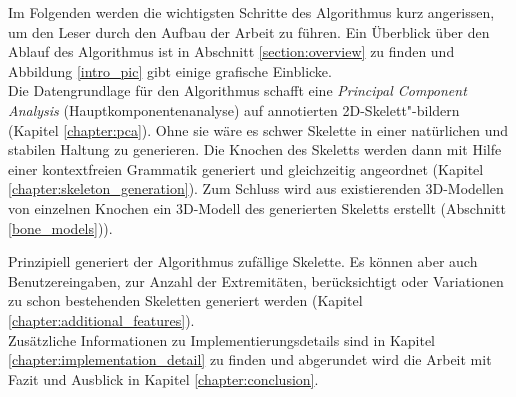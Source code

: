 Im Folgenden werden die wichtigsten Schritte des Algorithmus kurz angerissen, um den Leser durch den Aufbau der Arbeit zu führen. Ein Überblick über den Ablauf des Algorithmus ist in Abschnitt \ref{section:overview} zu finden und Abbildung \ref{intro_pic} gibt einige grafische Einblicke.\\
Die Datengrundlage für den Algorithmus schafft eine \emph{Principal Component Analysis} (Hauptkomponentenanalyse) auf annotierten 2D-Skelett"-bildern (Kapitel \ref{chapter:pca}). Ohne sie wäre es schwer Skelette in einer natürlichen und stabilen Haltung zu generieren.
Die Knochen des Skeletts werden dann mit Hilfe einer kontextfreien Grammatik generiert und gleichzeitig angeordnet (Kapitel \ref{chapter:skeleton_generation}). 
Zum Schluss wird aus existierenden 3D-Modellen von einzelnen Knochen ein 3D-Modell des generierten Skeletts erstellt (Abschnitt \ref{bone_models})).

Prinzipiell generiert der Algorithmus zufällige Skelette. Es können aber auch Benutzereingaben, \zb zur Anzahl der Extremitäten, berücksichtigt oder Variationen zu schon bestehenden Skeletten generiert werden (Kapitel \ref{chapter:additional_features}). \\
Zusätzliche Informationen zu Implementierungsdetails sind in Kapitel \ref{chapter:implementation_detail} zu finden und abgerundet wird die Arbeit mit Fazit und Ausblick in Kapitel \ref{chapter:conclusion}.


